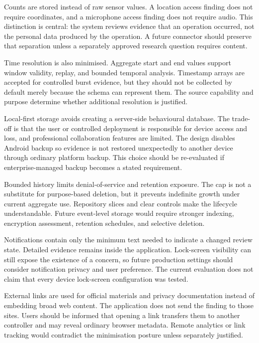 Counts are stored instead of raw sensor values. A location access finding does not require coordinates, and a microphone access finding does not require audio. This distinction is central: the system reviews evidence that an operation occurred, not the personal data produced by the operation. A future connector should preserve that separation unless a separately approved research question requires content.

Time resolution is also minimised. Aggregate start and end values support window validity, replay, and bounded temporal analysis. Timestamp arrays are accepted for controlled burst evidence, but they should not be collected by default merely because the schema can represent them. The source capability and purpose determine whether additional resolution is justified.

Local-first storage avoids creating a server-side behavioural database. The trade-off is that the user or controlled deployment is responsible for device access and loss, and professional collaboration features are limited. The design disables Android backup so evidence is not restored unexpectedly to another device through ordinary platform backup. This choice should be re-evaluated if enterprise-managed backup becomes a stated requirement.

Bounded history limits denial-of-service and retention exposure. The cap is not a substitute for purpose-based deletion, but it prevents indefinite growth under current aggregate use. Repository slices and clear controls make the lifecycle understandable. Future event-level storage would require stronger indexing, encryption assessment, retention schedules, and selective deletion.

Notifications contain only the minimum text needed to indicate a changed review state. Detailed evidence remains inside the application. Lock-screen visibility can still expose the existence of a concern, so future production settings should consider notification privacy and user preference. The current evaluation does not claim that every device lock-screen configuration was tested.

External links are used for official materials and privacy documentation instead of embedding broad web content. The application does not send the finding to those sites. Users should be informed that opening a link transfers them to another controller and may reveal ordinary browser metadata. Remote analytics or link tracking would contradict the minimisation posture unless separately justified.

